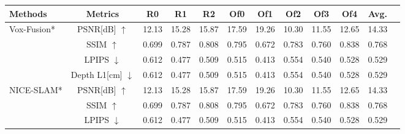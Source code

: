 \documentclass{article}
\begin{document}
 
\begin{table}[t]
\vspace{-10pt}

\label{tab:replica}
\centering
\begin{tabular}{l|c|cccccccccc}
\toprule
Methods & Metrics & R0 & R1 & R2 & Of0 & Of1 & Of2 & Of3 & Of4 & Avg.          \\
\midrule

\multirow{4}{*}{Vox-Fusion* \cite{}}                          
    & PSNR[dB] $\uparrow$    & \cellcolor{tabfirst}12.13       & 15.28        & 15.87        & 17.59        
                             & 19.26       & 10.30        & 11.55        & 12.65        & 14.33    \\
                                                                     
    & SSIM $\uparrow$        & 0.699       & 0.787        & 0.808        & 0.795        
                             & 0.672       & 0.783        & 0.760        & 0.838        & 0.768    \\
                                                                     
    & LPIPS $\downarrow$     & 0.612       & 0.477        & 0.509        & 0.515        
                             & 0.413       & 0.554        & 0.540        & 0.528        & 0.529    \\
    & Depth L1[cm] $\downarrow$  & 0.612       & 0.477        & 0.509        & 0.515        
                             & 0.413       & 0.554        & 0.540        & 0.528        & 0.529    \\

\midrule
\multirow{4}{*}{NICE-SLAM* \cite{}}                          
    & PSNR[dB] $\uparrow$    & 12.13       & 15.28        & 15.87        & 17.59        
                             & 19.26       & 10.30        & 11.55        & 12.65        & 14.33    \\
                                                                     
    & SSIM $\uparrow$        & 0.699       & 0.787        & 0.808        & 0.795        
                             & 0.672       & 0.783        & 0.760        & 0.838        & 0.768    \\
                                                                     
    & LPIPS $\downarrow$     & 0.612       & 0.477        & 0.509        & 0.515        
                             & 0.413       & 0.554        & 0.540        & 0.528        & 0.529    \\
                             

\end{tabular}
\end{table}
\end{document}
